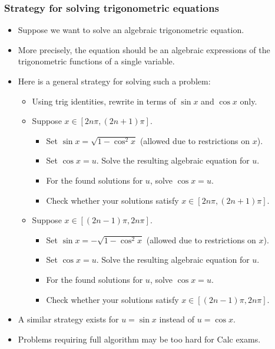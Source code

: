\begin{frame}
\frametitle{Strategy for solving trigonometric equations}
\begin{itemize}
\item Suppose we want to solve an algebraic trigonometric equation. 
\item More precisely, the equation should be an algebraic expressions of the trigonometric functions of a single variable. 
\item Here is a general strategy for solving such a problem:
\begin{itemize}
\item Using trig identities, rewrite in terms of $\sin x  $ and $\cos x$ only. 
\item Suppose $x\in [2n\pi, (2n+1)\pi]$. 
\begin{itemize}
\item Set $\sin x= \sqrt{1-\cos^2x} $ (allowed due to restrictions on $x$).
\item Set $\cos x=u$. Solve the resulting algebraic equation for $u$.
\item For the found solutions for $u$, solve $\cos x=u$.
\item Check whether your solutions satisfy $x\in [2n\pi, (2n+1)\pi]$.
\end{itemize}

\item Suppose  $x\in [(2n-1)\pi, 2n\pi]$. 
\begin{itemize}
\item Set $\sin x= -\sqrt{1-\cos^2x} $ (allowed due to restrictions on $x$).
\item Set $\cos x=u$. Solve the resulting algebraic equation for $u$.
\item For the found solutions for $u$, solve $\cos x=u$.
\item Check whether your solutions satisfy $x\in [(2n-1)\pi, 2n\pi]$.
\end{itemize}

\end{itemize}
\item A similar strategy exists for $u=\sin x$ instead of $u=\cos x$.
\item Problems requiring full algorithm may be too hard for Calc exams.
\end{itemize}
\end{frame}